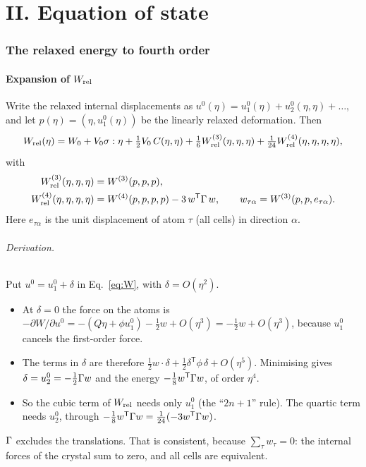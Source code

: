 \documentclass[11pt,a4paper]{article}
\newcommand{\al}{\alpha}\newcommand{\be}{\beta}\newcommand{\ga}{\gamma}\newcommand{\de}{\delta}
\newcommand{\Wt}{W^{(3)}}\newcommand{\Wf}{W^{(4)}}
\begin{document}
\part*{II. Equation of state}

\section{The relaxed energy to fourth order}\label{sec:W3}
\subsection{Expansion of \texorpdfstring{$W_{\rm rel}$}{W\_rel}}
Write the relaxed internal displacements as $u^0(\eta)=u^0_1(\eta)+u^0_2(\eta,\eta)+\dots$, and let
$p(\eta)=(\eta,u^0_1(\eta))$ be the linearly relaxed deformation. Then
\begin{equation}
W_{\rm rel}(\eta)=W_0+V_0\si:\eta+\tfrac12V_0\,C(\eta,\eta)+\tfrac16\Wt_{\rm rel}(\eta,\eta,\eta)
+\tfrac1{24}\Wf_{\rm rel}(\eta,\eta,\eta,\eta),
\label{eq:Wrelexp}
\end{equation}
with
\begin{align}
\Wt_{\rm rel}(\eta,\eta,\eta)&=\Wt(p,p,p),\label{eq:W3rel}\\
\Wf_{\rm rel}(\eta,\eta,\eta,\eta)&=\Wf(p,p,p,p)-3\,w^{\mathsf T}\Ga\,w,\qquad
w_{\tau\al}=\Wt(p,p,e_{\tau\al}).\label{eq:W4rel}
\end{align}
Here $e_{\tau\al}$ is the unit displacement of atom $\tau$ (all cells) in direction $\al$.

\paragraph{Derivation.} Put $u^0=u^0_1+\delta$ in Eq.~\eqref{eq:W}, with $\delta=O(\eta^2)$.
\begin{itemize}
\item At $\delta=0$ the force on the atoms is
  $-\partial W/\partial u^0=-(Q\eta+\phi u^0_1)-\tfrac12w+O(\eta^3)=-\tfrac12w+O(\eta^3)$,
  because $u^0_1$ cancels the first-order force.
\item The terms in $\delta$ are therefore $\tfrac12w\cdot\delta+\tfrac12\delta^{\mathsf T}\phi\,\delta+O(\eta^5)$.
  Minimising gives $\delta=u^0_2=-\tfrac12\Gamma w$ and the energy $-\tfrac18w^{\mathsf T}\Gamma w$, of order $\eta^4$.
\item So the cubic term of $W_{\rm rel}$ needs only $u^0_1$ (the ``$2n+1$'' rule). The quartic term
  needs $u^0_2$, through $-\tfrac18w^{\mathsf T}\Gamma w=\tfrac1{24}(-3w^{\mathsf T}\Gamma w)$.
\end{itemize}
$\Gamma$ excludes the translations. That is consistent, because $\sum_\tau w_\tau=0$: the internal forces of the
crystal sum to zero, and all cells are equivalent.
\end{document}
